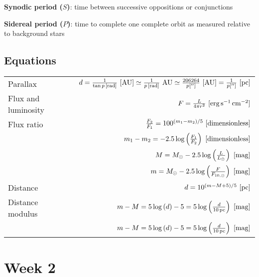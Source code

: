 \documentclass[a4paper,10pt]{article}
\begin{document}
\textbf{Synodic period ($S$)}: time between successive oppositions or conjunctions 

\textbf{Sidereal period ($P$)}: time to complete one complete orbit as measured relative to background stars

\subsection{Equations}
\vspace{0.5cm}

\begin{tabularx}{\textwidth}{ l X r }
    Parallax && $d = \frac{1}{\tan p\,[{\rm rad}]}~[{\rm AU}] \simeq \frac{1}{p\,[{\rm rad}]} ~ {\rm AU} \simeq \frac{206264}{p['']}~[{\rm AU}] = \frac{1}{p['']}~[{\rm pc}]$ \\ 
    \addlinespace[0.5cm]
    Flux and luminosity && $F = \frac{L}{4\pi r^2}~[{\rm erg\,s^{-1}\,cm^{-2}}]$ \\
    \addlinespace[0.5cm]
    Flux ratio && $\frac{F_2}{F_1} = 100^{(m_1-m_2)/5}~[{\rm dimensionless}]$ \\
    \addlinespace[0.5cm]
               && $m_1 - m_2 = -2.5\log\left(\frac{F_1}{F_2}\right)~[{\rm dimensionless}]$ \\
    \addlinespace[0.5cm]
               && $M = M_\odot - 2.5\log\left(\frac{L}{L_\odot}\right)~[{\rm mag}]$ \\
    \addlinespace[0.5cm]
               && $m = M_\odot - 2.5\log\left(\frac{F}{F_{10, \odot}}\right)~[{\rm mag}]$ \\
    \addlinespace[0.5cm]
    Distance && $d = 10^{(m-M+5)/5}~[{\rm pc}]$ \\
    \addlinespace[0.5cm]
    Distance modulus && $m-M = 5\log\left(d\right)-5 = 5\log\left({\frac{d}{10\,{\rm pc}}}\right)~[{\rm mag}]$ \\ 
    \addlinespace[0.5cm]
                     && $m-M = 5\log\left(d\right)-5 = 5\log\left({\frac{d}{10\,{\rm pc}}}\right)~[{\rm mag}]$

\end{tabularx}




\newpage
\section{Week 2}
\end{document}
